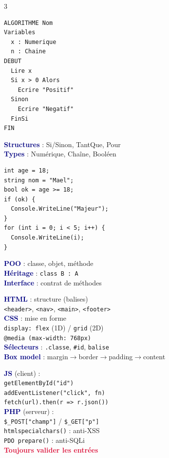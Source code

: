 \documentclass[a4paper,9pt]{article}
\newcommand{\key}[1]{\textbf{\textcolor{navy}{#1}}}
\newcommand{\warn}[1]{\textbf{\textcolor{crimson}{#1}}}
\begin{document}
\begin{multicols}{3}
\begin{tcolorbox}[basebox, colframe=teal, title=ALGORITHMIQUE — Structure]
\small
\begin{verbatim}
ALGORITHME Nom
Variables
  x : Numerique
  n : Chaine
DEBUT
  Lire x
  Si x > 0 Alors
    Ecrire "Positif"
  Sinon
    Ecrire "Negatif"
  FinSi
FIN
\end{verbatim}
\normalsize
\key{Structures} : Si/Sinon, TantQue, Pour \\
\key{Types} : Numérique, Chaîne, Booléen
\end{tcolorbox}

\begin{tcolorbox}[basebox, colframe=teal, title=C\# — Bases]
\small
\begin{verbatim}
int age = 18;
string nom = "Mael";
bool ok = age >= 18;
if (ok) {
  Console.WriteLine("Majeur");
}
for (int i = 0; i < 5; i++) {
  Console.WriteLine(i);
}
\end{verbatim}
\normalsize
\key{POO} : classe, objet, méthode \\
\key{Héritage} : \texttt{class B : A} \\
\key{Interface} : contrat de méthodes
\end{tcolorbox}

\begin{tcolorbox}[basebox, colframe=navy, title=CRÉATION WEB — HTML/CSS]
\key{HTML} : structure (balises) \\
\texttt{<header>}, \texttt{<nav>}, \texttt{<main>}, \texttt{<footer>} \\[2pt]
\key{CSS} : mise en forme \\
\texttt{display: flex} (1D) / \texttt{grid} (2D) \\
\texttt{@media (max-width: 768px)} \\[2pt]
\key{Sélecteurs} : \texttt{.classe}, \texttt{\#id}, \texttt{balise} \\
\key{Box model} : margin$\to$border$\to$padding$\to$content
\end{tcolorbox}

\begin{tcolorbox}[basebox, colframe=navy, title=CRÉATION WEB — JS \& PHP]
\key{JS} (client) :\\
\texttt{getElementById("id")} \\
\texttt{addEventListener("click", fn)} \\
\texttt{fetch(url).then(r => r.json())} \\[2pt]
\key{PHP} (serveur) :\\
\texttt{\$\_POST["champ"]} / \texttt{\$\_GET["p"]} \\
\texttt{htmlspecialchars()} : anti-XSS \\
\texttt{PDO prepare()} : anti-SQLi \\
\warn{Toujours valider les entrées}
\end{tcolorbox}


\end{multicols}
\end{document}
